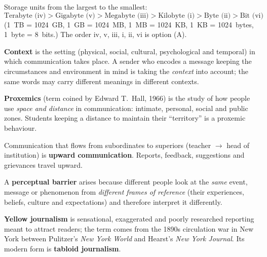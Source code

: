 Storage units from the largest to the smallest:
\[\text{Terabyte (iv)} > \text{Gigabyte (v)} > \text{Megabyte (iii)} > \text{Kilobyte (i)} > \text{Byte (ii)} > \text{Bit (vi)}\]
(1~TB = 1024~GB, 1~GB = 1024~MB, 1~MB = 1024~KB, 1~KB = 1024~bytes, 1~byte = 8~bits.) The order iv, v, iii, i, ii, vi is option (A).

\textbf{Context} is the setting (physical, social, cultural, psychological and temporal) in which communication takes place. A sender who encodes a message keeping the circumstances and environment in mind is taking the \emph{context} into account; the same words may carry different meanings in different contexts.

\textbf{Proxemics} (term coined by Edward T.~Hall, 1966) is the study of how people use \emph{space and distance} in communication: intimate, personal, social and public zones. Students keeping a distance to maintain their ``territory'' is a proxemic behaviour.

Communication that flows from subordinates to superiors (teacher $\rightarrow$ head of institution) is \textbf{upward communication}. Reports, feedback, suggestions and grievances travel upward.

A \textbf{perceptual barrier} arises because different people look at the \emph{same} event, message or phenomenon from \emph{different frames of reference} (their experiences, beliefs, culture and expectations) and therefore interpret it differently.

\textbf{Yellow journalism} is sensational, exaggerated and poorly researched reporting meant to attract readers; the term comes from the 1890s circulation war in New York between Pulitzer's \emph{New York World} and Hearst's \emph{New York Journal}. Its modern form is \textbf{tabloid journalism}.

